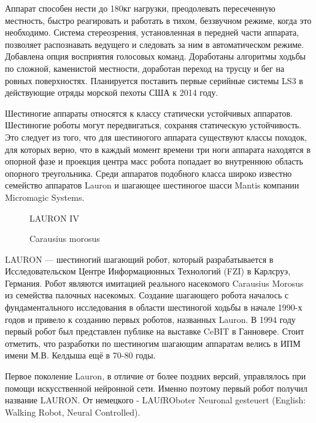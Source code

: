 Аппарат способен нести до 180кг нагрузки, преодолевать пересеченную местность, быстро реагировать и работать в тихом, беззвучном режиме, когда это необходимо. Система стереозрения, установленная в передней части аппарата, позволяет распознавать ведущего и следовать за ним в автоматическом режиме. Добавлена опция восприятия голосовых команд. Доработаны алгоритмы ходьбы по сложной, каменистой местности, доработан переход на трусцу и бег на ровных поверхностях. Планируется поставить первые серийные системы LS3 в действующие отряды морской пехоты США к 2014 году.


Шестиногие аппараты относятся к классу статически устойчивых аппаратов. Шестиногие роботы могут передвигаться, сохраняя статическую устойчивость. Это следует из того, что для шестиногого аппарата существуют классы походок, для которых верно, что в каждый момент времени три ноги аппарата находятся в опорной фазе и проекция центра масс робота попадает во внутреннюю область опорного треугольника. Среди аппаратов подобного класса широко известно семейство аппаратов Lauron и шагающее шестиногое шасси Mantis компании Micromagic Systems.


\begin{figure}[h]
\begin{minipage}[h]{0.49\linewidth}
\caption{LAURON IV}
\end{minipage}
\begin{minipage}[h]{0.49\linewidth}
\caption{Carausius morosus}
\end{minipage}
\end{figure}


LAURON --- шестиногий шагающий робот, который разрабатывается в Исследовательском Центре Информационных Технологий (FZI) в Карлсруэ, Германия. Робот являются имитацией реального насекомого Carausius Morosus из семейства палочных насекомых. Создание шагающего робота началось с фундаментального исследования в области шестиногой ходьбы в начале 1990-х годов и привело к созданию первых роботов, названных Lauron. В 1994 году первый робот был представлен публике на выставке CeBIT в Ганновере. Стоит отметить, что разработки  по шестиногим шагающим аппаратам велись в ИПМ имени М.В. Келдыша ещё в 70-80 годы.

Первое поколение Lauron, в отличие от более поздних версий, управлялось при помощи искусственной нейронной сети. Именно поэтому первый робот получил название LAURON. От немецкого - LAUfROboter Neuronal gesteuert (English: Walking Robot, Neural Controlled).

